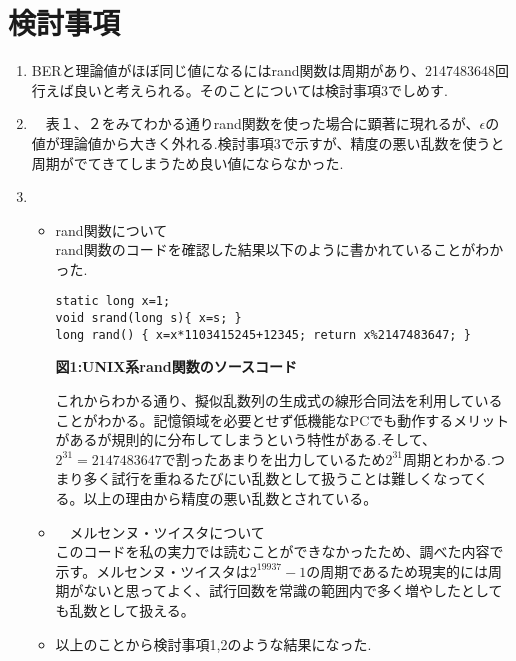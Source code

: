 \documentclass[12pt]{jarticle}
\begin{document}
\section{検討事項}
\begin{enumerate}
\item BERと理論値がほぼ同じ値になるにはrand関数は周期があり、2147483648回行えば良いと考えられる。そのことについては検討事項3でしめす.

\item　表１、２をみてわかる通りrand関数を使った場合に顕著に現れるが、$\epsilon$の値が理論値から大きく外れる.検討事項3で示すが、精度の悪い乱数を使うと周期がでてきてしまうため良い値にならなかった.
  
\item
  \begin{itemize}
  \item rand関数について \\
    rand関数のコードを確認した結果以下のように書かれていることがわかった.
    \begin{center}
      \begin{screen}
\begin{verbatim}
static long x=1;
void srand(long s){ x=s; }
long rand() { x=x*1103415245+12345; return x%2147483647; }
\end{verbatim}
      \end{screen}
      \textbf{図1:UNIX系rand関数のソースコード}
    \end{center}
    
   これからわかる通り、擬似乱数列の生成式の線形合同法を利用していることがわかる。記憶領域を必要とせず低機能なPCでも動作するメリットがあるが規則的に分布してしまうという特性がある.そして、$2^{31}=2147483647$で割ったあまりを出力しているため$2^{31}$周期とわかる.つまり多く試行を重ねるたびにい乱数として扱うことは難しくなってくる。以上の理由から精度の悪い乱数とされている。
  \item　メルセンヌ・ツイスタについて\\
    このコードを私の実力では読むことができなかったため、調べた内容で示す。メルセンヌ・ツイスタは$2^{19937}-1$の周期であるため現実的には周期がないと思ってよく、試行回数を常識の範囲内で多く増やしたとしても乱数として扱える。
  \item
    以上のことから検討事項1,2のような結果になった.
  \end{itemize}
\end{enumerate}
\end{document}
